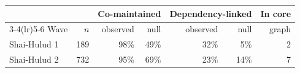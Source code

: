 \begin{tabular}{lrrrrrr}
\toprule
 & & \multicolumn{2}{c}{Co-maintained} & \multicolumn{2}{c}{Dependency-linked} & In core \\
\cmidrule(lr){3-4}\cmidrule(lr){5-6}
Wave & $n$ & observed & null & observed & null & graph \\
\midrule
Shai-Hulud 1 & 189 & 98\% & 49\% & 32\% & 5\% & 2 \\
Shai-Hulud 2 & 732 & 95\% & 69\% & 23\% & 14\% & 7 \\
\bottomrule
\end{tabular}
